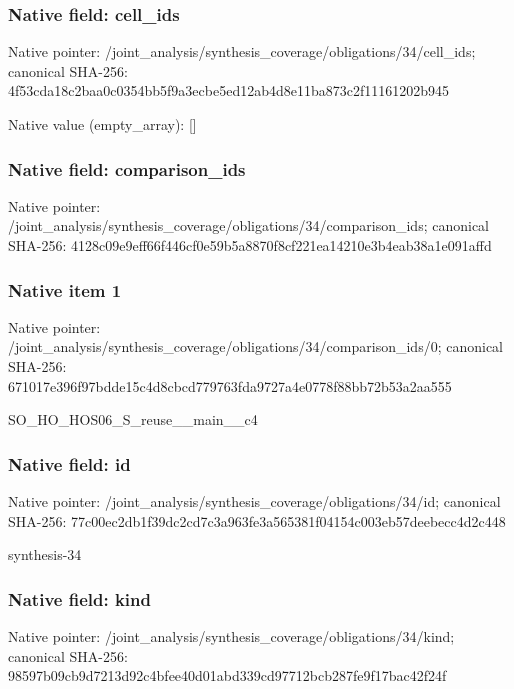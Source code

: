 \documentclass[10pt,a4paper]{article}
\begin{document}
\subsubsection{Native field: cell\_\allowbreak{}ids}
Native pointer: /joint\_\allowbreak{}analysis/synthesis\_\allowbreak{}coverage/obligations/34/cell\_\allowbreak{}ids; canonical SHA-256: 4f53cda18c2baa0c0354bb5f9a3ecbe5ed12ab4d8e11ba873c2f11161202b945

Native value (empty\_\allowbreak{}array): []

\subsubsection{Native field: comparison\_\allowbreak{}ids}
Native pointer: /joint\_\allowbreak{}analysis/synthesis\_\allowbreak{}coverage/obligations/34/comparison\_\allowbreak{}ids; canonical SHA-256: 4128c09e9eff66f446cf0e59b5a8870f8cf221ea14210e3b4eab38a1e091affd

\subsubsection{Native item 1}
Native pointer: /joint\_\allowbreak{}analysis/synthesis\_\allowbreak{}coverage/obligations/34/comparison\_\allowbreak{}ids/0; canonical SHA-256: 671017e396f97bdde15c4d8cbcd779763fda9727a4e0778f88bb72b53a2aa555

\begingroup\raggedright\sloppy SO\_\allowbreak{}HO\_\allowbreak{}HOS06\_\allowbreak{}S\_\allowbreak{}reuse\_\allowbreak{}\_\allowbreak{}main\_\allowbreak{}\_\allowbreak{}c4\par\endgroup

\subsubsection{Native field: id}
Native pointer: /joint\_\allowbreak{}analysis/synthesis\_\allowbreak{}coverage/obligations/34/id; canonical SHA-256: 77c00ec2db1f39dc2cd7c3a963fe3a565381f04154c003eb57deebecc4d2c448

\begingroup\raggedright\sloppy synthesis-34\par\endgroup

\subsubsection{Native field: kind}
Native pointer: /joint\_\allowbreak{}analysis/synthesis\_\allowbreak{}coverage/obligations/34/kind; canonical SHA-256: 98597b09cb9d7213d92c4bfee40d01abd339cd97712bcb287fe9f17bac42f24f
\end{document}
